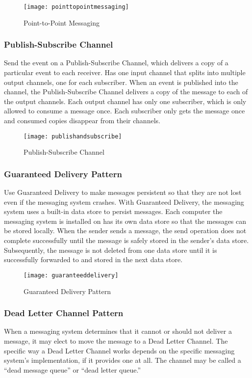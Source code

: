 \begin{figure}[h!]
  \center
  \texttt{[image: pointtopointmessaging]}
  \caption{Point-to-Point Messaging}
\end{figure}

\subsubsection{Publish-Subscribe Channel}
Send the event on a Publish-Subscribe Channel, which delivers a copy of a particular event to each receiver. Has one input channel that splits into multiple output channels, one for each subscriber. When an event is published into the channel, the Publish-Subscribe Channel delivers a copy of the message to each of the output channels. Each output channel has only one subscriber, which is only allowed to consume a message once. Each subscriber only gets the message once and consumed copies disappear from their channels.

\begin{figure}[H]
  \center
  \texttt{[image: publishandsubscribe]}
  \caption{Publish-Subscribe Channel}
\end{figure}

\subsubsection{Guaranteed Delivery Pattern}
Use Guaranteed Delivery to make messages persistent so that they are not lost even if the messaging system crashes.  With Guaranteed Delivery, the messaging system uses a built-in data store to persist messages. Each computer the messaging system is installed on has its own data store so that the messages can be stored locally. When the sender sends a message, the send operation does not complete successfully until the message is safely stored in the sender’s data store. Subsequently, the message is not deleted from one data store until it is successfully forwarded to and stored in the next data store.

\begin{figure}[H]
  \center
  \texttt{[image: guaranteeddelivery]}
  \caption{Guaranteed Delivery Pattern}
\end{figure}

\subsubsection{Dead Letter Channel Pattern}
When a messaging system determines that it cannot or should not deliver a message, it may elect to move the message to a Dead Letter Channel. The specific way a Dead Letter Channel works depends on the specific messaging system’s implementation, if it provides one at all. The channel may be called a “dead message queue” or “dead letter queue.”

